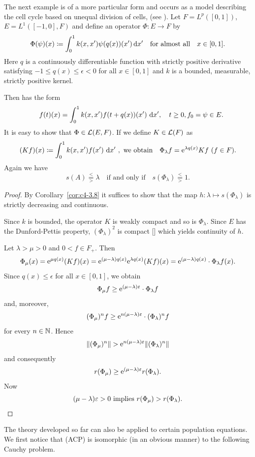 \begin{example}\label{ex:c4-3.11}
The next example is of a more particular form and occurs as a model describing the cell cycle based on unequal division of cells, (see  \textcite{arinokimmel:1985}).
Let $F = L^{p}([0,1])$,\, $E = L^{1}([-1,0], F)$ and define an operator $\Phi \colon E \to F$ by
\[
\Phi(\psi)(x) \coloneq \int_0^1 k(x,x')\psi(q(x))(x') \mathop{}\!\mathrm{d}{x}' \quad \text{for almost all} \quad x \in [0,1].
\]
Here $q$ is a continuously differentiable function with strictly positive derivative satisfying $-1 \leq q(x) \leq \epsilon < 0$ for all $x \in [0,1]$ and $k$ is a bounded, measurable, strictly positive kernel.

Then  has the form
\begin{equation} \label{eq:c4-3.12}
\quad f(t)(x) = \int_{0}^{1} k(x,x')f(t+q(x))(x') \, \dx', \quad t \geq 0, f_{0} = \psi \in E.
\end{equation}
It is easy to show that $\Phi \in \mathcal{L}(E,F)$.
If we define $K \in \mathcal{L}(F)$  as 
\[
(Kf)(x) \coloneq \int_{0}^{1} k(x,x')f(x') \, \mathop{}\!\mathrm{d}{x}' \ ,
\ \text{we obtain} \quad 
\Phi_{\lambda}f = \mathrm{e}^{\lambda q(x)}Kf \,\, (f \in F) .
\]
Again we have 
\begin{equation*}\label{eq:c4-3.12-kgk1}
s(A) \overset{<}{ \underset{>}{=} }\lambda \quad \text{if and only if} \quad s(\Phi_{\lambda}) \overset{<}{ \underset{>}{=} } 1  .
\end{equation*}
\end{example}
\begin{proof}
By Corollary~\ref{cor:c4-3.8} it suffices to show that the map $h \colon \lambda \mapsto s(\Phi_{\lambda})$ is strictly decreasing and continuous.

Since $k$ is bounded, the operator $K$ is weakly compact and so is $\Phi_{\lambda}$.
Since $E$ has the Dunford-Pettis property, $(\Phi_{\lambda})^{2}$ is compact [\textcite[Theorem II.9.9]{schaefer:1974}] which yields continuity of\/ $h$.

Let $\lambda > \mu > 0$ and $0 < f \in F_{+}$.
Then 
\[
\Phi_{\mu}(x) = 
\mathrm{e}^{\mu q(x)}(Kf)(x) = 
\mathrm{e}^{(\mu-\lambda)q(x)}\mathrm{e}^{\lambda q(x)}(Kf)(x) =
\mathrm{e}^{(\mu-\lambda)q(x)} \cdot \Phi_{\lambda}f(x) .
\]
Since $q(x) \leq \epsilon$ for all $x \in [0,1]$, we obtain 
\[
\Phi_{\mu}f \geq \eu^{(\mu-\lambda)\epsilon} \cdot \Phi_{\lambda}f
\]
and, moreover, 
\[
(\Phi_{\mu})^n f \geq \eu^{n(\mu-\lambda)\epsilon} \cdot (\Phi_{\lambda})^n f
\]
for every $n \in \mathbb{N}$.
Hence 
\[
\|(\Phi_{\mu})^n\| > \eu^{n(\mu-\lambda)\epsilon}\|(\Phi_{\lambda})^n\|
\]
and consequently 
\[
r(\Phi_{\mu}) \geq \eu^{(\mu-\lambda)\epsilon}r(\Phi_{\lambda}) .
\]
Now 
\begin{equation*}
\text{$(\mu-\lambda)\epsilon > 0$ implies 
$r(\Phi_{\mu}) > r(\Phi_{\lambda})$.}
\qedhere
\end{equation*}
\end{proof}
The theory developed so far can also be applied to certain population equations.
We first notice that (ACP) is isomorphic (in an obvious manner) to the following Cauchy problem.

